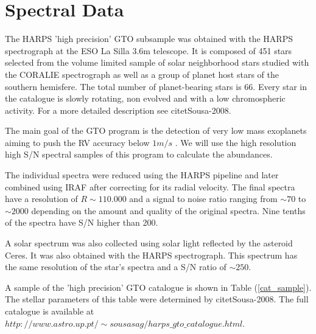 \documentclass[dvips,12pt,a4paper]{report}
\begin{document}
{\section {Spectral Data}

The HARPS 'high precision' GTO subsample was obtained with the HARPS spectrograph at the ESO La Silla 3.6m telescope. It is composed of 451 stars selected from the volume limited sample of solar neighborhood stars studied with the CORALIE spectrograph \citep{Udry-2000} as well as a group of planet host stars of the southern hemisfere. The total number of planet-bearing stars  is 66. Every star in the catalogue is slowly rotating, non evolved and with a low chromospheric activity. For a more detailed description see citet{Sousa-2008}.

The main goal of the GTO program is the detection of very low mass exoplanets aiming to push the RV accuracy below $1m/s$ \citep{Mayor-2003b}. We will use the high resolution high S/N spectral samples of this program to calculate the abundances. 

The individual spectra were reduced using the HARPS pipeline and later combined using IRAF after correcting for its radial velocity. The final spectra have a resolution of $R\sim110.000$ and a signal to noise ratio ranging from $\sim70$ to $\sim2000$ depending on the amount and quality of the original spectra. Nine tenths of the spectra have S/N higher than 200.  


A solar spectrum was also collected using solar light reflected by the asteroid Ceres. It was also obtained with the HARPS spectrograph. This spectrum has the same resolution of the star's spectra and a S/N ratio of $\sim250$. 

A sample of the 'high precision' GTO catalogue is shown in Table (\ref{cat_sample}). The stellar parameters of this table were determined by citet{Sousa-2008}. The full catalogue is available at $http://www.astro.up.pt/\sim sousasag/harps\_gto\_catalogue.html$. 

}
\end{document}
